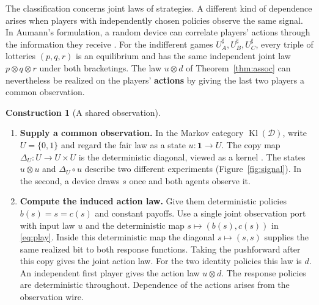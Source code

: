 \documentclass[11pt,a4paper]{article}
\theoremstyle{definition}
\newtheorem*{construction}{Construction}
\newcommand{\D}{\mathcal D}
\newcommand{\one}{\mathbf 1}
\newcommand{\Kl}{\operatorname{Kl}}
\begin{document}
The classification concerns joint laws of strategies. A different kind of dependence arises when players with independently chosen policies observe the same signal. In Aumann's formulation, a random device can correlate players' actions through the information they receive \cite{aumann}. For the indifferent games $U_A^\sharp,U_B^\sharp,U_C^\sharp$, every triple of lotteries $(p,q,r)$ is an equilibrium and has the same independent joint law $p\otimes q\otimes r$ under both bracketings. The law $u\otimes d$ of Theorem~\ref{thm:assoc} can nevertheless be realized on the players' \textbf{actions} by giving the last two players a common observation.

\begin{construction}[A shared observation]\leavevmode
    \begin{enumerate}[titledsteps]
        \item \textbf{Supply a common observation.} In the Markov category $\Kl(\D)$, write $U=\{0,1\}$ and regard the fair law as a state $u:\one\to U$. The copy map $\Delta_U:U\to U\times U$ is the deterministic diagonal, viewed as a kernel \cite{fritz}. The states $u\otimes u$ and $\Delta_U\circ u$ describe two different experiments (Figure~\ref{fig:signal}). In the second, a device draws $s$ once and both agents observe it.

        \item \textbf{Compute the induced action law.} Give them deterministic policies $b(s)=s=c(s)$ and constant payoffs. Use a single joint observation port with input law $u$ and the deterministic map $s\mapsto(b(s),c(s))$ in \eqref{eq:play}. Inside this deterministic map the diagonal $s\mapsto(s,s)$ supplies the same realized bit to both response functions. Taking the pushforward after this copy gives the joint action law. For the two identity policies this law is $d$. An independent first player gives the action law $u\otimes d$. The response policies are deterministic throughout. Dependence of the actions arises from the observation wire.
    \end{enumerate}
\end{construction}
\end{document}
